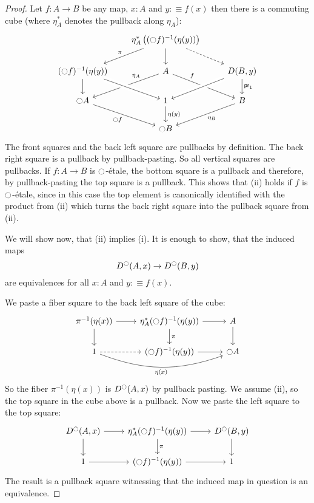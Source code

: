 \documentclass[9pt,twosided]{amsart}
\begin{document}
\begin{proof}
Let $f:A\to B$ be any map, $x:A$ and $y:\equiv f(x)$ then there is a commuting cube (where $\eta_A^\ast$ denotes the pullback along $\eta_A$):
\begin{equation*}
  \begin{tikzcd}
    &[-1ex] \eta_A^\ast\left((\modal f)^{-1}(\eta(y))\right)\arrow[dr,dashed]\arrow[dl,"\pi",swap]\arrow[d] &                         \\
(\modal f)^{-1}(\eta(y))\arrow[d] & A\arrow[dr, "f" near start]\arrow[dl, "\eta_A" near start, swap]     & D(B,y)\arrow[d,"\proj 1"]\arrow[dl, crossing over]   \\
 \modal A\arrow[dr, "\modal f",swap]  & 1\arrow[d ,"\eta(y)"]\arrow[from=ul, crossing over] & B\arrow[dl,"\eta_B"] \\
          & \modal B &
  \end{tikzcd}
\end{equation*}
The front squares and the back left square are pullbacks by definition. The back right square is a pullback by pullback-pasting. So all vertical squares are pullbacks.
If $f:A\to B$ is ${\ocircle}$-étale, the bottom square is a pullback and therefore, by pullback-pasting the top square is a pullback. This shows that (ii) holds if $f$ is ${\ocircle}$-étale, since in this case the top element is canonically identified with the product from (ii) which turns the back right square into the pullback square from (ii).

We will show now, that (ii) implies (i).
It is enough to show, that the induced maps
\[ D^{\ocircle}(A,x)\to D^{\ocircle}(B,y) \]
are equivalences for all $x:A$ and $y:\equiv f(x)$.

We paste a fiber square to the back left square of the cube:
\begin{equation*}
  \begin{tikzcd}
      \pi^{-1}(\eta(x))\arrow[r]\arrow[d] & \eta_A^\ast(\modal f)^{-1}(\eta(y))\arrow[r]\arrow[d, "\pi"] & A\arrow[d] \\
      1\arrow[rr,bend right=20,"\eta(x)",swap]\arrow[r,dashed]  & (\modal f)^{-1}(\eta(y))\arrow[r] & \modal A
  \end{tikzcd}
\end{equation*}
So the fiber $\pi^{-1}(\eta(x))$ is $D^{\ocircle}(A,x)$ by pullback pasting.
We assume (ii), so the top square in the cube above is a pullback.
Now we paste the left square to the top square:
\begin{equation*}
  \begin{tikzcd}
      D^\modal(A,x)\arrow[d]\arrow[r] & \eta_A^\ast(\modal f)^{-1}(\eta(y))\arrow[r]\arrow[d, "\pi"] & D^\modal(B,y)\arrow[d] \\
      1\arrow[r]                                & (\modal f)^{-1}(\eta(y))\arrow[r] & 1 
  \end{tikzcd}
\end{equation*}
The result is a pullback square witnessing that the induced map in question is an equivalence.


\end{proof}
\end{document}
